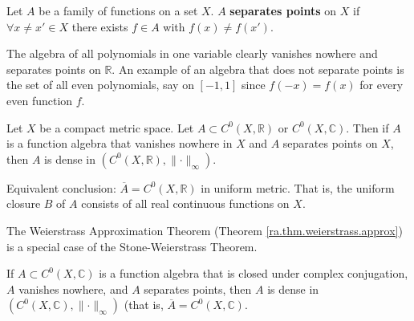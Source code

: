 \begin{definition}

Let \(A\) be a family of functions on a set \(X\). \(A\) \textbf{separates points} on \(X\) if \(\forall x \neq x' \in X\) there exists \( f \in A\) with \(f(x) \neq f(x').\)

\end{definition}

\begin{example}

The algebra of all polynomials in one variable clearly vanishes nowhere and separates points on \(\mathbb{R}\). An example of an algebra that does not separate points is the set of all even polynomials, say on \([-1,1]\) since \(f(-x) = f(x)\) for every even function \(f\).


\end{example}

\begin{theorem}\label{ra.stone.weierstrass}

Let \(X\) be a compact metric space. Let \(A \subset C^0(X, \mathbb{R})\) or \(C^0(X, \mathbb{C})\). Then if \(A\) is a function algebra that vanishes nowhere in \(X\) and \(A\) separates points on \(X\), then \(A\) is dense in \((C^0(X, \mathbb{R}), \lVert \cdot \rVert_\infty)\).

Equivalent conclusion: \(\overline{A} = C^0(X, \mathbb{R})\) in uniform metric. That is, the uniform closure \(B\) of \(A\) consists of all real continuous functions on \(X\).

\end{theorem}

\begin{remark}

The Weierstrass Approximation Theorem (Theorem \ref{ra.thm.weierstrass.approx}) is a special case of the Stone-Weierstrass Theorem.

\end{remark}

\begin{theorem}\label{ra.stone.weierstrass.cmpx}

If \(A \subset C^0(X, \mathbb{C})\) is a function algebra that is closed under complex conjugation, \(A\) vanishes nowhere, and \(A\) separates points, then \(A\) is dense in \((C^0(X, \mathbb{C}), \lVert \cdot \rVert_\infty)\) (that is, \(\overline{A} = C^0(X, \mathbb{C})\).

\end{theorem}

